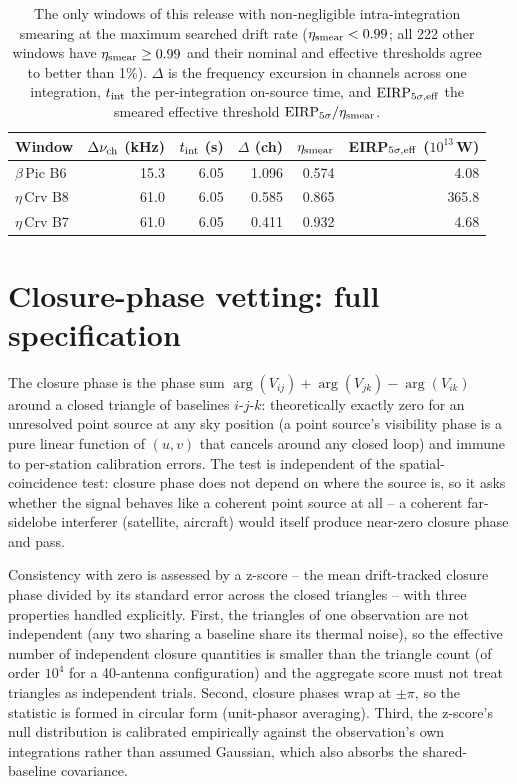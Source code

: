 \documentclass{openjournal}
\begin{document}
\begin{table}
\centering
\caption{The only windows of this release with non-negligible
intra-integration smearing at the maximum searched drift rate
($\eta_{\rm smear}<0.99$; all 222 other windows have
$\eta_{\rm smear}\ge0.99$ and their nominal and effective thresholds
agree to better than 1\%). $\Delta$ is the frequency excursion in
channels across one integration, $t_{\rm int}$ the per-integration
on-source time, and $\mathrm{EIRP}_{5\sigma,\rm eff}$ the smeared
effective threshold $\mathrm{EIRP}_{5\sigma}/\eta_{\rm smear}$.}
\label{tab:smear}
\begin{tabular}{lrrrrr}
\toprule
Window & $\Delta\nu_{\rm ch}$ (kHz) & $t_{\rm int}$ (s) & $\Delta$ (ch) &
$\eta_{\rm smear}$ & EIRP$_{5\sigma,\rm eff}$ ($10^{13}$\,W) \\
\midrule
$\beta$\,Pic B6 & 15.3 & 6.05 & 1.096 & 0.574 & 4.08 \\
$\eta$\,Crv B8 & 61.0 & 6.05 & 0.585 & 0.865 & 365.8 \\
$\eta$\,Crv B7 & 61.0 & 6.05 & 0.411 & 0.932 & 4.68 \\
\bottomrule
\end{tabular}
\end{table}

\section{Closure-phase vetting: full specification}
\label{app:closure}

The closure phase is the phase sum
$\arg(V_{ij}) + \arg(V_{jk}) - \arg(V_{ik})$ around a closed triangle
of baselines $i$-$j$-$k$: theoretically exactly zero for an unresolved
point source at any sky position (a point source's visibility phase is
a pure linear function of $(u,v)$ that cancels around any closed
loop) and immune to per-station calibration errors. The test is
independent of the spatial-coincidence test: closure phase does not
depend on where the source is, so it asks whether the signal behaves
like a coherent point source at all -- a coherent far-sidelobe
interferer (satellite, aircraft) would itself produce near-zero
closure phase and pass.

Consistency with zero is assessed by a z-score -- the mean
drift-tracked closure phase divided by its standard error across the
closed triangles -- with three properties handled explicitly. First,
the triangles of one observation are not independent (any two sharing
a baseline share its thermal noise), so the effective number of
independent closure quantities is smaller than the triangle count (of
order $10^{4}$ for a 40-antenna configuration) and the aggregate
score must not treat triangles as independent trials. Second, closure
phases wrap at $\pm\pi$, so the statistic is formed in circular form
(unit-phasor averaging). Third, the z-score's null distribution is
calibrated empirically against the observation's own integrations
rather than assumed Gaussian, which also absorbs the shared-baseline
covariance.
\end{document}
